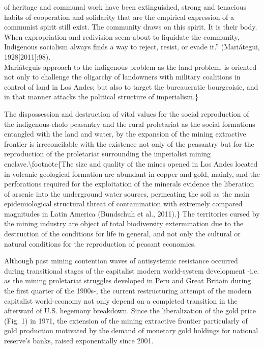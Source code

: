 \documentclass[
]{article}
\begin{document}
of heritage and communal work have been extinguished, strong and
tenacious habits of cooperation and solidarity that are the empirical
expression of a communist spirit still exist. The community draws on
this spirit. It is their body. When expropriation and redivision seem
about to liquidate the community, Indigenous socialism always finds a
way to reject, resist, or evade it.'' (Mariátegui, 1928{[}2011{]}:98).\\
Mariátegui\textquotesingle s approach to the indigenous problem as the
land problem, is oriented not only to challenge the oligarchy of
landowners with military coalitions in control of land in Los Andes; but
also to target the bureaucratic bourgeoisie, and in that manner attacks
the political structure of imperialism.\}

The dispossession and destruction of vital values for the social
reproduction of the indigenous-cholo peasantry and the rural proletariat
as the social formations entangled with the land and water, by the
expansion of the mining extractive frontier is irreconcilable with the
existence not only of the peasantry but for the reproduction of the
proletariat surrounding the imperialist mining
enclave.\textbackslash footnote\{The size and quality of the mines
opened in Los Andes located in volcanic geological formation are
abundant in copper and gold, mainly, and the perforations required for
the exploitation of the minerals evidence the liberation of arsenic into
the underground water sources, permeating the soil as the main
epidemiological structural threat of contamination with extremely
compared magnitudes in Latin America (Bundschuh et al., 2011).\} The
territories cursed by the mining industry are object of total
biodiversity extermination due to the destruction of the conditions for
life in general, and not only the cultural or natural conditions for the
reproduction of peasant economies.

Although past mining contention waves of antisystemic resistance
occurred during transitional stages of the capitalist modern
world-system development -i.e. as the mining proletariat struggles
developed in Peru and Great Britain during the first quarter of the
1900s-, the current restructuring attempt of the modern capitalist
world-economy not only depend on a completed transition in the afterward
of U.S. hegemony breakdown. Since the liberalization of the gold price
(Fig. 1) in 1971, the extension of the mining extractive frontier
particularly of gold production motivated by the demand of monetary gold
holdings for national reserve's banks, raised exponentially since 2001.
\end{document}
